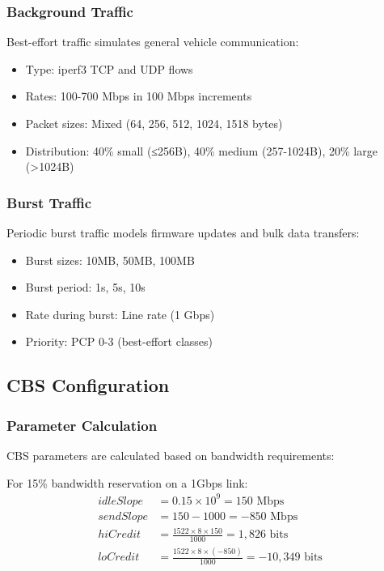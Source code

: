 \documentclass[10pt, journal, compsoc]{IEEEtran}
\begin{document}
\subsubsection{Background Traffic}

Best-effort traffic simulates general vehicle communication:

\begin{itemize}
    \item Type: iperf3 TCP and UDP flows
    \item Rates: 100-700 Mbps in 100 Mbps increments
    \item Packet sizes: Mixed (64, 256, 512, 1024, 1518 bytes)
    \item Distribution: 40\% small (≤256B), 40\% medium (257-1024B), 20\% large (>1024B)
\end{itemize}

\subsubsection{Burst Traffic}

Periodic burst traffic models firmware updates and bulk data transfers:

\begin{itemize}
    \item Burst sizes: 10MB, 50MB, 100MB
    \item Burst period: 1s, 5s, 10s
    \item Rate during burst: Line rate (1 Gbps)
    \item Priority: PCP 0-3 (best-effort classes)
\end{itemize}

\subsection{CBS Configuration}

\subsubsection{Parameter Calculation}

CBS parameters are calculated based on bandwidth requirements:

For 15\% bandwidth reservation on a 1Gbps link:
\begin{align}
idleSlope &= 0.15 \times 10^9 = 150 \text{ Mbps} \\
sendSlope &= 150 - 1000 = -850 \text{ Mbps} \\
hiCredit &= \frac{1522 \times 8 \times 150}{1000} = 1,826 \text{ bits} \\
loCredit &= \frac{1522 \times 8 \times (-850)}{1000} = -10,349 \text{ bits}
\end{align}
\end{document}
